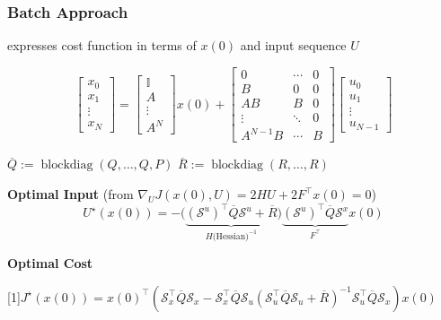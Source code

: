 \subsubsection{Batch Approach}

expresses cost function in terms of $x(0)$ and input sequence $U$

\[ \begin{bmatrix}
		x_0    \\
		x_1    \\
		\vdots \\
		x_N
	\end{bmatrix}
	=
	\begin{bmatrix}
		\mathbb{I} \\
		A          \\
		\vdots     \\
		A^N
	\end{bmatrix}
	x(0) +
	\begin{bmatrix}
		0        & \cdots & 0 \\
		B        & 0      & 0 \\
		AB       & B      & 0 \\
		\vdots   & \ddots & 0 \\
		A^{N-1}B & \cdots & B
	\end{bmatrix}
	\begin{bmatrix}
		u_0    \\
		u_1    \\
		\vdots \\
		u_{N-1}
	\end{bmatrix} \]


$\overline{Q} := \mathop{\mathrm{blockdiag}}(Q,\dots, Q,P)$
\quad
$\overline{R} := \mathop{\mathrm{blockdiag}}(R,\dots, R)$

\textbf{Optimal Input}
(from $\nabla_UJ(x(0),U)=2HU+2F^\top x(0)=0$)
\[ U^\star(x(0)) =
	- \bigl(
	\underbrace{
			(\mathcal{S}^u)^\top \overline{Q} \mathcal{S}^u + \overline{R}
		}_{H\text{(Hessian)}^{-1}}
	\bigr)
	\underbrace{
		(\mathcal{S}^u)^\top \overline{Q}\mathcal{S}^x
	}_ {F^\top}
	x(0)
\]


\textbf{Optimal Cost}

\scalebox{0.97}[1]{$
		\scriptstyle
		J^\star(x(0)) = x(0)^\top (
		\mathcal{S}_x^\top \overline{Q} \mathcal{S}_x
		- \mathcal{S}_x^\top \overline{Q} \mathcal{S}_u
		(\mathcal{S}_u^\top \overline{Q} \mathcal{S}_u
		+ \overline{R})^{-1}
		\mathcal{S}_u^\top \overline{Q} \mathcal{S}_x
		)x(0)$}


